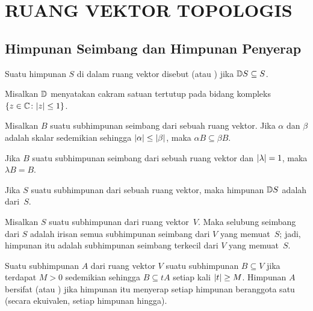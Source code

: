 \chapter{RUANG VEKTOR TOPOLOGIS}

\section{Himpunan Seimbang dan Himpunan Penyerap}

\begin{defn} Suatu himpunan $S$ di dalam ruang vektor disebut
 (atau ) jika $\mathbb{D} S \subseteq S$.
\end{defn}

\begin{notn} Misalkan $\mathbb{D}$ menyatakan cakram satuan tertutup
pada bidang kompleks $\{z \in \mathbb{C}\colon \lvert z\rvert \le 1\}$.
\end{notn}

\begin{prop} Misalkan $B$ suatu subhimpunan seimbang dari sebuah ruang vektor. Jika $\alpha$ dan $\beta$ adalah skalar sedemikian sehingga $\lvert\alpha\rvert \le \lvert\beta\rvert$,
maka $\alpha B \subseteq \beta B$.
\end{prop}

\begin{cor} Jika $B$ suatu subhimpunan seimbang dari sebuah ruang vektor dan $\lvert\lambda\rvert =1$, maka $\lambda B = B$.
\end{cor}

\begin{defn} Jika $S$ suatu subhimpunan dari sebuah ruang vektor, maka himpunan $\mathbb{D} S$ adalah
 dari~$S$.
\end{defn}

\begin{prop} Misalkan $S$ suatu subhimpunan dari ruang vektor~$V$.  Maka selubung seimbang dari $S$ adalah irisan semua
subhimpunan seimbang dari $V$ yang memuat~$S$; jadi, himpunan itu adalah subhimpunan seimbang terkecil dari $V$ yang memuat~$S$.
\end{prop}

\begin{defn} Suatu subhimpunan $A$ dari ruang vektor $V$
 suatu subhimpunan $B \subseteq V$ jika terdapat $M > 0$ sedemikian sehingga $B \subseteq tA$ setiap kali $\lvert t\rvert \ge M$.
Himpunan $A$ bersifat
 (atau ) jika himpunan itu menyerap setiap himpunan beranggota satu (secara ekuivalen, setiap himpunan hingga).
\end{defn}

